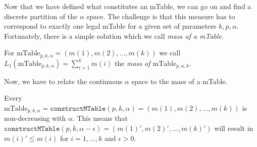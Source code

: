 Now that we have defined what constitutes an mTable, we can go on and find a discrete partition of the $\alpha$ space. The challenge is that this measure has to correspond to exactly one legal mTable for a given set of parameters $k,p,\alpha$. Fortunately, there is a simple solution which we call \textit{mass of a mTable}.
%
%
%
%
\begin{definition}
	\label{def:05:Mass of a MTable}
	For $\text{mTable}_{p,k,\alpha}=(m(1) , m(2) , \ldots , m(k))$ we call\\
	$L_1(\text{mTable}_{p,k,\alpha})=\sum_{i=1}^k m(i)$ the \textit{mass of $\text{mTable}_{p,\alpha,k}$}.
\end{definition}
%
Now, we have to relate the continuous $\alpha$ space to the mass of a mTable.
%
\begin{lemma}
	\label{lemma:05:non-decreasing-with-alpha-mtable}
	Every $\text{mTable}_{p,k,\alpha}=\texttt{constructMTable}(p,k,\alpha)=(m(1) , m(2) , \ldots , m(k))$ is non-decreasing with $\alpha$. This means that
	$\texttt{constructMTable}(p,k,\alpha - \epsilon) = (m(1)' , m(2)' , \ldots , m(k)')$ will result in $m(i)' \leq m(i)$ for $i=1,\ldots,k$ and $\epsilon > 0$.
\end{lemma}
